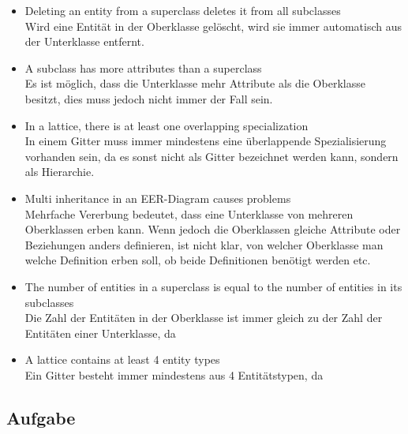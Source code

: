 \documentclass[11pt,a4paper,DIV=9]{scrartcl}
\newcounter{temp}
\newcommand{\aufgabe}[1]{
  \setcounter{temp}{\value{subsection}}
  \setcounter{subsection}{#1}
  \addtocounter{subsection}{-1}
  \subsection{Aufgabe}
  \setcounter{subsection}{\value{temp}}
}
\begin{document}
\begin{itemize}
 \item Deleting an entity from a superclass deletes it from all subclasses
 \\ Wird eine Entit\"at in der Oberklasse gel\"oscht, wird sie immer automatisch aus der Unterklasse entfernt. \\
 \item A subclass has more attributes than a superclass
 \\ Es ist m\"oglich, dass die Unterklasse mehr Attribute als die Oberklasse besitzt, dies muss jedoch nicht immer der Fall sein. \\
 \item In a lattice, there is at least one overlapping specialization
 \\ In einem Gitter muss immer mindestens eine \"uberlappende Spezialisierung vorhanden sein, da es sonst nicht als Gitter bezeichnet werden kann, sondern als Hierarchie. \\
 \item Multi inheritance in an EER-Diagram causes problems
 \\ Mehrfache Vererbung bedeutet, dass eine Unterklasse von mehreren Oberklassen erben kann. Wenn jedoch die Oberklassen gleiche Attribute oder Beziehungen anders definieren, ist nicht klar, von welcher Oberklasse man welche Definition erben soll, ob beide Definitionen ben\"otigt werden etc. \\
 \item The number of entities in a superclass is equal to the number of entities in its subclasses
 \\ Die Zahl der Entit\"aten in der Oberklasse ist immer gleich zu der Zahl der Entit\"aten einer Unterklasse, da
 \item A lattice contains at least 4 entity types
 \\ Ein Gitter besteht immer mindestens aus 4 Entit\"atstypen, da
\end{itemize}
\aufgabe{4}
\end{document}
